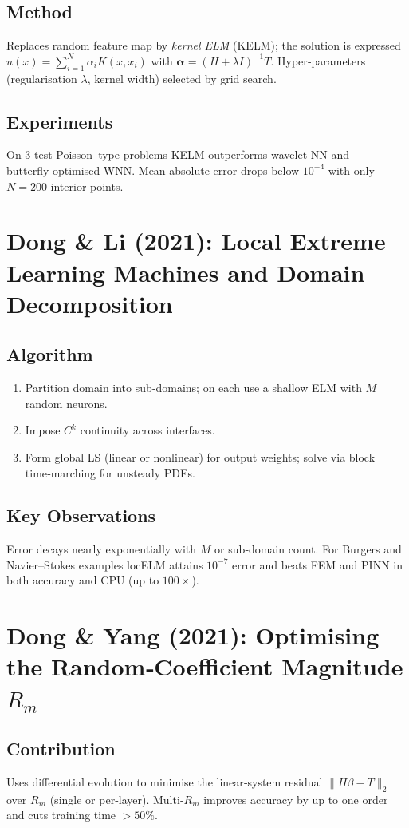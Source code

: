 \documentclass{article}
\begin{document}
\subsection*{Method}
Replaces random feature map by \emph{kernel ELM} (KELM); the solution is expressed
\(
u(x)=\sum_{i=1}^N \alpha_i K(x,x_i)
\)
with $\boldsymbol\alpha=(H+\lambda I)^{-1}T$.  Hyper‑parameters (regularisation $\lambda$, kernel width) selected by grid search.

\subsection*{Experiments}
On 3 test Poisson–type problems KELM outperforms wavelet NN and butterfly‑optimised WNN.  Mean absolute error drops below $10^{-4}$ with only $N=200$ interior points.

\section{Dong \& Li (2021): Local Extreme Learning Machines and Domain Decomposition}
\subsection*{Algorithm}
\begin{enumerate}
\item Partition domain into sub‑domains; on each use a shallow ELM with $M$ random neurons.
\item Impose $C^k$ continuity across interfaces.
\item Form global LS (linear or nonlinear) for output weights; solve via block time‑marching for unsteady PDEs.
\end{enumerate}

\subsection*{Key Observations}
Error decays nearly exponentially with $M$ or sub‑domain count. For Burgers and Navier–Stokes examples locELM attains $10^{-7}$ error and beats FEM and PINN in both accuracy and CPU (up to $100\times$).

\section{Dong \& Yang (2021): Optimising the Random‑Coefficient Magnitude $R_m$}
\subsection*{Contribution}
Uses differential evolution to minimise the linear‑system residual $\|H\beta-T\|_2$ over $R_m$ (single or per‑layer). Multi‑$R_m$ improves accuracy by up to one order and cuts training time $>50\%$.
\end{document}
